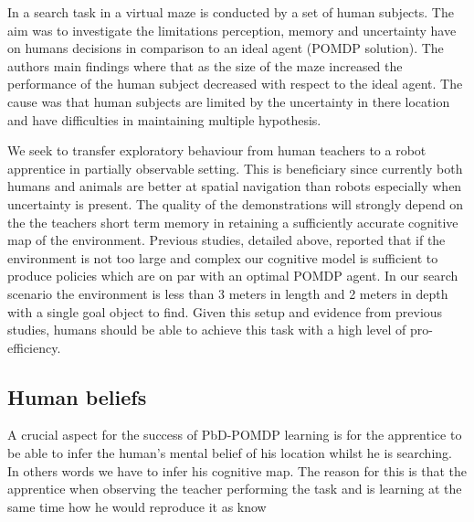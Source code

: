 In \cite{stankiewicz2006lost} a search task in a virtual maze is conducted by a set of human subjects. The aim 
was to investigate the limitations perception, memory and uncertainty have on humans decisions in comparison 
to an ideal agent (POMDP solution). The authors main findings where that as the size of the maze increased the
performance of the human subject decreased with respect to the ideal agent. The cause was that human subjects are limited by the 
uncertainty in there location and have difficulties in maintaining multiple hypothesis.

We seek to transfer exploratory behaviour from human teachers to a robot apprentice in partially observable setting. 
This is beneficiary since currently both humans and animals are better at spatial navigation than robots \cite{stankiewicz2006lost} 
especially when uncertainty is present. The quality of the demonstrations will strongly depend on the the teachers short term memory 
in retaining a sufficiently accurate cognitive map of the environment. Previous studies, detailed above, reported that if 
the environment is not too large and complex our cognitive model is sufficient to produce policies which are on par with an 
optimal POMDP agent. In our search scenario the environment is less than 3 meters in length and 2 meters in depth with a single goal object to find. Given 
this setup and evidence from previous studies, humans should be able to achieve this task with a high level of pro-efficiency. 


\subsection{Human beliefs}



A crucial aspect for the success of PbD-POMDP learning is for the apprentice to be able to infer 
the human's mental belief of his location whilst he is searching. In others words we have to 
infer his cognitive map. The reason for this is that the apprentice when observing the teacher 
performing the task and is learning at the same time how he would reproduce it as know 

